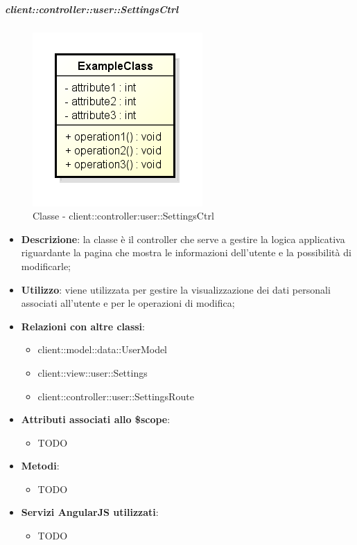 		\subparagraph{client::controller::user::SettingsCtrl} %
		\label{subp:client_controller_user_settingsctrl}
			\begin{figure}[htbp]
				\centering
				\centerline{\includegraphics[scale=0.7]{./images/client/classes/example_class.png}}
				\caption{Classe - client::controller:user::SettingsCtrl}
			\end{figure}
			\begin{itemize}
				\item \textbf{Descrizione}: la classe è il controller che serve a gestire la logica applicativa riguardante la pagina che mostra le informazioni dell'utente e la possibilità di modificarle;
				\item \textbf{Utilizzo}: viene utilizzata per gestire la visualizzazione dei dati personali associati all'utente e per le operazioni di modifica;
				\item \textbf{Relazioni con altre classi}:
					\begin{itemize}
						\item client::model::data::UserModel
						\item client::view::user::Settings
						\item client::controller::user::SettingsRoute
					\end{itemize}

				\item \textbf{Attributi associati allo \$scope}:
					\begin{itemize}
						\item TODO
					\end{itemize}

				\item \textbf{Metodi}:
					\begin{itemize}
						\item TODO
					\end{itemize}

				\item \textbf{Servizi AngularJS utilizzati}:
					\begin{itemize}
						\item TODO
					\end{itemize}

			\end{itemize}

